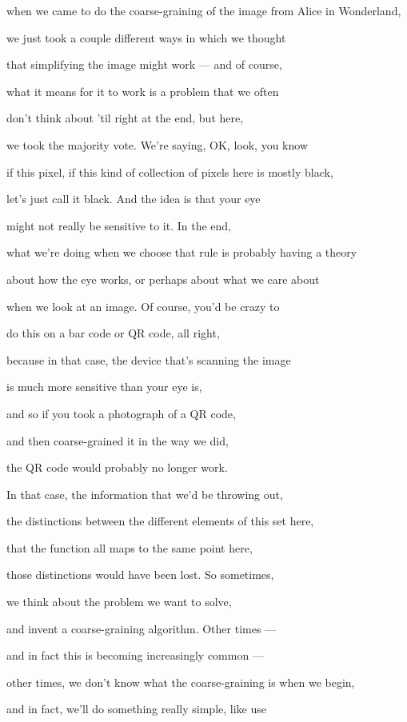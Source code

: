 \documentclass[]{article}
\begin{document}
when we came to do the coarse-graining
of the image from Alice in Wonderland,

we just took a couple different ways
in which we thought

that simplifying the image
might work --- and of course,

what it means for it to work
is a problem that we often

don't think about 'til
right at the end, but here,

we took the majority vote.
We're saying, OK, look, you know

if this pixel, if this kind of collection
of pixels here is mostly black,

let's just call it black.
And the idea is that your eye

might not really be
sensitive to it. In the end,

what we're doing when we choose
that rule is probably having a theory

about how the eye works,
or perhaps about what we care about

when we look at an image.
Of course, you'd be crazy to

do this on a bar code or QR code,
all right,

because in that case, the device
that's scanning the image

is much more sensitive
than your eye is,

and so if you took a photograph
of a QR code,

and then coarse-grained it
in the way we did,

the QR code would probably
no longer work.

In that case, the information that
we'd be throwing out,

the distinctions between the different
elements of this set here,

that the function all maps
to the same point here,

those distinctions would have been lost.
So sometimes,

we think about the problem we want
to solve,

and invent a coarse-graining algorithm.
Other times ---

and in fact this is becoming
increasingly common ---

other times, we don't know what
the coarse-graining is when we begin,

and in fact, we'll do something
really simple, like use
\end{document}
